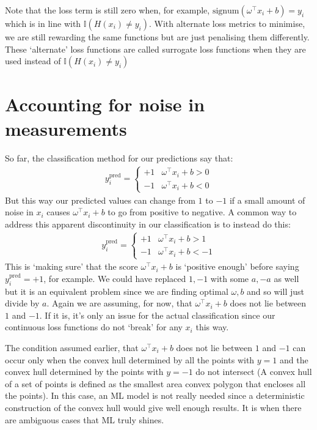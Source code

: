 \documentclass[12pt]{article}
\begin{document}
Note that the loss term is still zero when, for example, $\textrm{signum}(\omega^{\top}x_i + b) = y_i$ which is in line with $\mathbb{I}(H(x_i) \neq y_i)$. With alternate loss metrics to minimise, we are still rewarding the same functions but are just penalising them differently. These `alternate' loss functions are called surrogate loss functions when they are used instead of $\mathbb{I}(H(x_i)\neq y_i)$

\section{Accounting for noise in measurements}
So far, the classification method for our predictions say that:
\begin{align}
    y_i^{\textrm{pred}} = \begin{cases}
        +1 & \omega^{\top}x_i + b > 0\\
        -1 & \omega^{\top}x_i + b < 0
    \end{cases}
\end{align}
But this way our predicted values can change from $1$ to $-1$ if a small amount of noise in $x_i$ causes $\omega^{\top}x_i + b$ to go from positive to negative. A common way to address this apparent discontinuity in our classification is to instead do this:
\begin{align}
    y_i^{\textrm{pred}} = \begin{cases}
        +1 & \omega^{\top}x_i + b > 1\\
        -1 & \omega^{\top}x_i + b < -1
    \end{cases}
\end{align}
This is `making sure' that the score $\omega^{\top}x_i + b$ is `positive enough' before saying $y_i^{\textrm{pred}} = +1$, for example. We could have replaced $1,-1$ with some $a,-a$ as well but it is an equivalent problem since we are finding optimal $\omega,b$ and so will just divide by $a$. Again we are assuming, for now, that $\omega^{\top}x_i + b$ does not lie between $1$ and $-1$. If it is, it's only an issue for the actual classification since our continuous loss functions do not `break' for any $x_i$ this way. 
\begin{tcolorbox}
The condition assumed earlier, that $\omega^{\top}x_i + b$ does not lie between $1$ and $-1$ can occur only when the convex hull determined by all the points with $y=1$ and the convex hull determined by the points with $y=-1$ do not intersect (A convex hull of a set of points is defined as the smallest area convex polygon that encloses all the points). In this case, an ML model is not really needed since a deterministic construction of the convex hull would give well enough results. It is when there are ambiguous cases that ML truly shines.
\end{tcolorbox}
\end{document}
